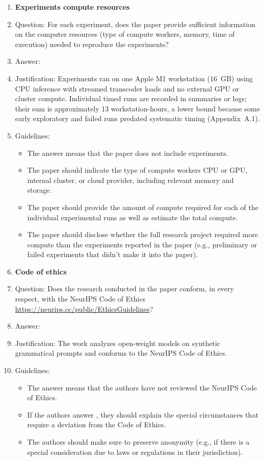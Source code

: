 \documentclass[
]{article}
\begin{document}
\begin{enumerate}
\item {\bf Experiments compute resources}
    \item[] Question: For each experiment, does the paper provide sufficient information on the computer resources (type of compute workers, memory, time of execution) needed to reproduce the experiments?
    \item[] Answer: \answerYes{} %
    \item[] Justification: Experiments ran on one Apple M1 workstation (16~GB) using CPU inference with streamed transcoder loads and no external GPU or cluster compute. Individual timed runs are recorded in summaries or logs; their sum is approximately 13 workstation-hours, a lower bound because some early exploratory and failed runs predated systematic timing (Appendix~A.1).
    \item[] Guidelines:
    \begin{itemize}
        \item The answer \answerNA{} means that the paper does not include experiments.
        \item The paper should indicate the type of compute workers CPU or GPU, internal cluster, or cloud provider, including relevant memory and storage.
        \item The paper should provide the amount of compute required for each of the individual experimental runs as well as estimate the total compute. 
        \item The paper should disclose whether the full research project required more compute than the experiments reported in the paper (e.g., preliminary or failed experiments that didn't make it into the paper). 
    \end{itemize}
    
\item {\bf Code of ethics}
    \item[] Question: Does the research conducted in the paper conform, in every respect, with the NeurIPS Code of Ethics \url{https://neurips.cc/public/EthicsGuidelines}?
    \item[] Answer: \answerYes{} %
    \item[] Justification: The work analyzes open-weight models on synthetic grammatical prompts and conforms to the NeurIPS Code of Ethics.
    \item[] Guidelines:
    \begin{itemize}
        \item The answer \answerNA{} means that the authors have not reviewed the NeurIPS Code of Ethics.
        \item If the authors answer \answerNo, they should explain the special circumstances that require a deviation from the Code of Ethics.
        \item The authors should make sure to preserve anonymity (e.g., if there is a special consideration due to laws or regulations in their jurisdiction).
    \end{itemize}



\end{enumerate}
\end{document}
